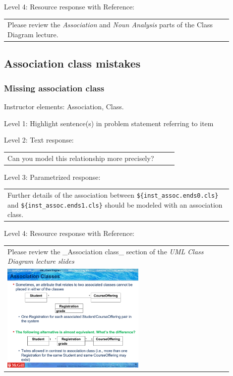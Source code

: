 \noindent Level 4: Resource response with Reference: \medskip

\begin{tabular}{|p{0.9\linewidth}}
Please review the \textit{Association} and \textit{Noun Analysis} parts of the Class Diagram lecture.
\end{tabular} \medskip


\subsection{Association class mistakes}

\subsubsection{Missing association class}

Instructor elements: Association, Class. \medskip

\noindent Level 1: Highlight sentence(s) in problem statement referring to item \medskip

\noindent Level 2: Text response: \medskip

\begin{tabular}{|p{0.9\linewidth}}
Can you model this relationship more precisely?
\end{tabular} \medskip

\noindent Level 3: Parametrized response: \medskip

\begin{tabular}{|p{0.9\linewidth}}
Further details of the association between \verb|${inst_assoc.ends0.cls}| and \verb|${inst_assoc.ends1.cls}| should be modeled with an association class.
\end{tabular} \medskip

\noindent Level 4: Resource response with Reference: \medskip

\begin{tabular}{|p{0.9\linewidth}}
Please review the _Association class_ section of the
\textit{UML Class Diagram lecture slides}

\\
\includegraphics[width=0.6\textwidth]{images/association_class.png}
\end{tabular} \medskip


